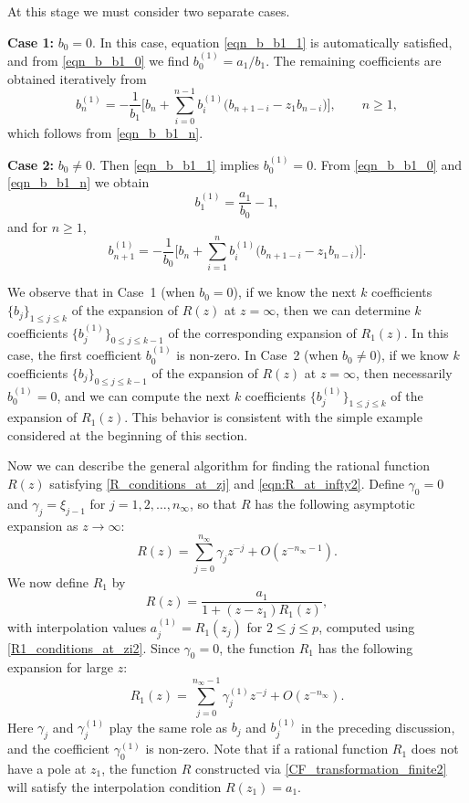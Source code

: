 \documentclass[12pt]{article}
\begin{document}
At this stage we must consider two separate cases.  

\vspace{0.2cm}
\noindent
{\bf Case 1:}  $b_0=0$. In this case, equation \eqref{eqn_b_b1_1} is automatically satisfied, and from 
\eqref{eqn_b_b1_0} we find $b_0^{(1)}=a_1/b_1$. The remaining coefficients are obtained iteratively from
\[
b_n^{(1)}=-\frac{1}{b_1} \Bigg[ b_n +  
 \sum_{i=0}^{n-1} b_{i}^{(1)} \big( b_{n+1-i}- z_1 b_{n-i} \big) \Bigg], \qquad n\ge 1,
\]
which follows from \eqref{eqn_b_b1_n}.  

\vspace{0.2cm}
\noindent
{\bf Case 2:}  $b_0 \neq 0$.  
Then \eqref{eqn_b_b1_1} implies $b_0^{(1)}=0$. From \eqref{eqn_b_b1_0} and 
\eqref{eqn_b_b1_n} we obtain
\[
b_1^{(1)}=\frac{a_1}{b_0}-1,
\]
and for $n\ge 1$,
\[
b_{n+1}^{(1)}=-\frac{1}{b_0} \Bigg[ b_n +  
 \sum_{i=1}^{n} b_{i}^{(1)} \big( b_{n+1-i}- z_1 b_{n-i} \big) \Bigg].
\]





We observe that in Case~1 (when $b_0=0$), if we know the next $k$ coefficients $\{b_j\}_{1 \le j \le k}$ of the expansion of $R(z)$ at $z=\infty$, then we can determine $k$ coefficients 
$\{b_j^{(1)}\}_{0 \le j \le k-1}$ of the corresponding expansion of $R_1(z)$. In this case, the first coefficient $b_0^{(1)}$ is non-zero. In Case~2 (when $b_0 \neq 0$), if we know $k$ coefficients $\{b_j\}_{0 \le j \le k-1}$ of the expansion of $R(z)$ at $z=\infty$, then necessarily $b_0^{(1)}=0$, and we can compute the next $k$ coefficients 
$\{b_j^{(1)}\}_{1 \le j \le k}$ of the expansion of $R_1(z)$. This behavior is consistent with the simple example considered at the beginning of this section.  

Now we can describe the general algorithm for finding the rational function $R(z)$ satisfying \eqref{R_conditions_at_zj} and \eqref{eqn:R_at_infty2}. Define $\gamma_0=0$ and $\gamma_j=\xi_{j-1}$ for $j=1,2,\dots,n_{\infty}$, so that $R$ has the following asymptotic expansion as $z \to \infty$: 
\begin{equation}\label{R_infty_gamma}
R(z)=\sum_{j=0}^{n_{\infty}} \gamma_j z^{-j} + 
O(z^{-n_{\infty}-1}). 
\end{equation}
We now define $R_1$ by 
\begin{equation}\label{CF_transformation_finite2}
R(z)=\frac{a_1}{1+(z-z_1) R_1(z)}, 
\end{equation}
with interpolation values $a_j^{(1)}=R_1(z_j)$ for $2 \le j \le p$, computed using \eqref{R1_conditions_at_zi2}. Since $\gamma_0=0$, the function $R_1$ has the following expansion for large $z$: 
\begin{equation*}
R_1(z)=\sum_{j=0}^{n_{\infty}-1} \gamma^{(1)}_j z^{-j}+O(z^{-n_{\infty}}). 
\end{equation*}
Here $\gamma_j$ and $\gamma_j^{(1)}$ play the same role as $b_j$ and $b_j^{(1)}$ in the preceding discussion, and the coefficient $\gamma_0^{(1)}$ is non-zero. Note that if a rational function $R_1$ does not have a pole at $z_1$, the function $R$ constructed via 
\eqref{CF_transformation_finite2} will satisfy the interpolation condition $R(z_1)=a_1$. 
\end{document}
